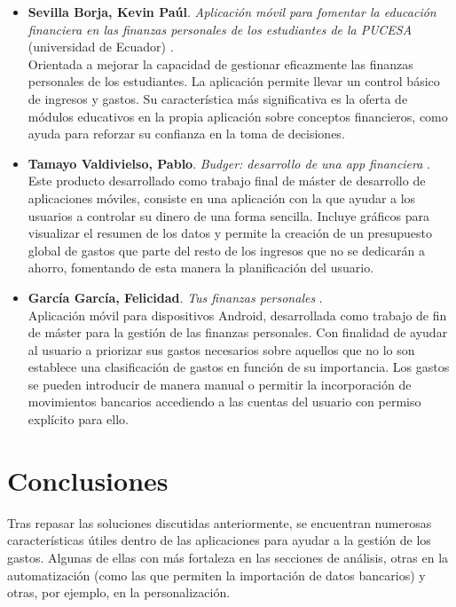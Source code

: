 \begin{itemize}
    \item \textbf{Sevilla Borja, Kevin Paúl}. 
    \textit{Aplicación móvil para fomentar la educación financiera en las finanzas personales 
    de los estudiantes de la PUCESA} (universidad de Ecuador) \cite{sevilla2024aplicacion}. \\
    Orientada a mejorar la capacidad
    de gestionar eficazmente las finanzas personales de los estudiantes. La aplicación 
    permite llevar un control básico de ingresos y gastos. Su característica más significativa 
    es la oferta de módulos educativos en la propia aplicación sobre conceptos financieros, como 
    ayuda para reforzar su confianza en la toma de decisiones.

    \item \textbf{Tamayo Valdivielso, Pablo}. 
    \textit{Budger: desarrollo de una app financiera} \cite{tamayo2022aplicacion}. \\ 
    Este producto desarrollado como 
    trabajo final de máster de desarrollo de aplicaciones móviles, consiste en una aplicación 
    con la que ayudar a los usuarios a controlar su dinero de una forma sencilla. Incluye 
    gráficos para visualizar el resumen de los datos y 
    permite la creación de un presupuesto global de gastos que parte del resto de los ingresos 
    que no se dedicarán a ahorro, fomentando de esta manera la planificación del usuario.

    \item \textbf{García García, Felicidad}. 
    \textit{Tus finanzas personales} \cite{garcia2019aplicacion}. \\  
    Aplicación móvil para dispositivos Android, 
    desarrollada como trabajo de fin de máster para la gestión de las finanzas personales. 
    Con finalidad de ayudar al usuario a priorizar sus gastos necesarios sobre aquellos
    que no lo son establece una clasificación de gastos en función de su importancia. 
    Los gastos se pueden introducir de manera manual o permitir la incorporación de 
    movimientos bancarios accediendo a las cuentas del usuario con permiso explícito para ello.
    
\end{itemize}

\section{Conclusiones}
Tras repasar las soluciones discutidas anteriormente, se encuentran numerosas 
características útiles dentro de las aplicaciones para ayudar a la gestión 
de los gastos. Algunas de ellas con más fortaleza en las secciones de análisis, 
otras en la automatización (como las que permiten la importación de datos bancarios) y  
otras, por ejemplo, en la personalización. 

